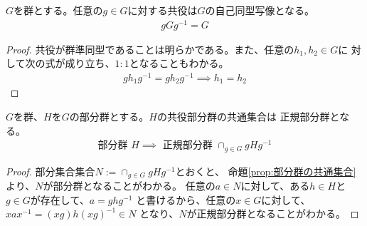 {	\begin{proposition}[共役は自己同型]\label{prop:共役は自己同型} %
		$G$を群とする。任意の$g\in G$に対する共役は$G$の自己同型写像となる。
		\begin{equation*}\begin{split}
			gGg^{-1} = G
		\end{split}\end{equation*}
	\end{proposition} %
	\begin{proof} %
		共役が群準同型であることは明らかである。また、任意の$h_1,h_2\in G$に
		対して次の式が成り立ち、$1:1$となることもわかる。
		\begin{equation*}\begin{split}
			gh_1g^{-1} = gh_2g^{-1}
			\implies h_1 = h_2
		\end{split}\end{equation*}
	\end{proof} %

	\begin{proposition}[共役部分群の共通集合]\label{prop:共役部分群の共通集合} %
		$G$を群、$H$を$G$の部分群とする。$H$の共役部分群の共通集合は
		正規部分群となる。
		\begin{equation*}\begin{split}
			\text{部分群 } H \implies \text{ 正規部分群 } \cap_{g\in G} gHg^{-1}
		\end{split}\end{equation*}
	\end{proposition} %
	\begin{proof} %
		部分集合集合$N:=\cap_{g\in G} gHg^{-1}$とおくと、
		命題\ref{prop:部分群の共通集合}より、$N$が部分群となることがわかる。
		任意の$a\in N$に対して、ある$h\in H$と$g\in G$が存在して、$a=ghg^{-1}$
		と書けるから、任意の$x\in G$に対して、$xax^{-1}=(xg)h(xg)^{-1}\in N$
		となり、$N$が正規部分群となることがわかる。
	\end{proof} %
}
